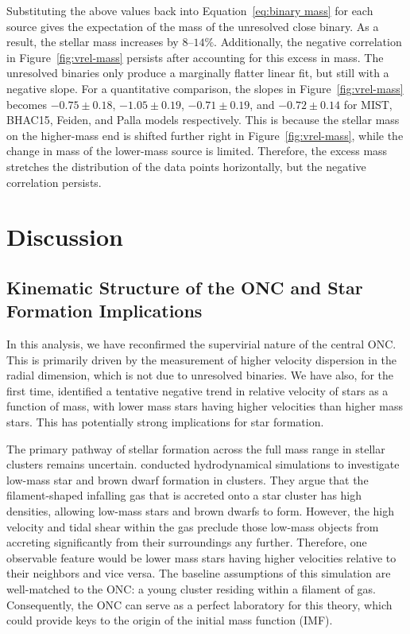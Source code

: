 \documentclass[12pt]{ucsddissertation}
\begin{document}
\begin{CJK*}{UTF8}{gbsn}
Substituting the above values back into Equation~\ref{eq:binary mass} for each source gives the expectation of the mass of the unresolved close binary.  As a result, the stellar mass increases by $8$--$14\%$.  Additionally, the negative correlation in Figure~\ref{fig:vrel-mass} persists after accounting for this excess in mass. The unresolved binaries only produce a marginally flatter linear fit, but still with a negative slope. For a quantitative comparison, the slopes in Figure~\ref{fig:vrel-mass} becomes $-0.75\pm0.18$, $-1.05\pm0.19$, $-0.71\pm0.19$, and $-0.72\pm0.14$ for MIST, BHAC15, Feiden, and Palla models respectively.  This is because the stellar mass on the higher-mass end is shifted further right in Figure~\ref{fig:vrel-mass}, while the change in mass of the lower-mass source is limited.  Therefore, the excess mass stretches the distribution of the data points horizontally, but the negative correlation persists.


\section{Discussion}
\label{onc-sec:discussion}

\subsection{Kinematic Structure of the ONC and Star Formation Implications}

In this analysis, we have reconfirmed the supervirial nature of the central ONC.  This is primarily driven by the measurement of higher velocity dispersion in the radial dimension, which is not due to unresolved binaries.  We have also, for the first time, identified a tentative negative trend in relative velocity of stars as a function of mass, with lower mass stars having higher velocities than higher mass stars.  This has potentially strong implications for star formation.

The primary pathway of stellar formation across the full mass range in stellar clusters remains uncertain. \citet{Bonnell-2008} conducted hydrodynamical simulations to investigate low-mass star and brown dwarf formation in clusters. They argue that the filament-shaped infalling gas that is accreted onto a star cluster has high densities, allowing low-mass stars and brown dwarfs to form. However, the high velocity and tidal shear within the gas preclude those low-mass objects from accreting significantly from their surroundings any further. Therefore, one observable feature would be lower mass stars having higher velocities relative to their neighbors and vice versa. The baseline assumptions of this simulation are well-matched to the ONC: a young cluster residing within a filament of gas. Consequently, the ONC can serve as a perfect laboratory for this theory, which could provide keys to the origin of the initial mass function (IMF). 


\end{CJK*}
\end{document}
